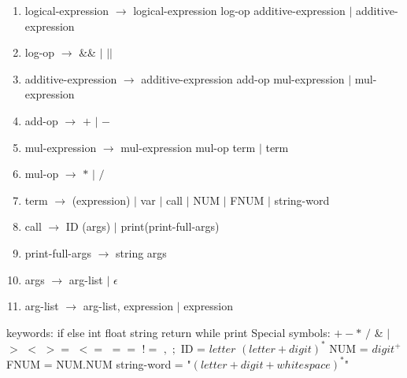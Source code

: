 \documentclass{article}
\begin{document}
\begin{enumerate}
    \item logical-expression $\rightarrow$ logical-expression log-op additive-expression $|$ additive-expression
    \item log-op $\rightarrow$ \&\& $|$ $||$
    \item additive-expression $\rightarrow$ additive-expression add-op mul-expression $|$ mul-expression
    \item add-op $\rightarrow$ $+$ $|$ $-$
    \item mul-expression $\rightarrow$ mul-expression mul-op term $|$ term
    \item mul-op $\rightarrow$ $*$ $|$ $/$
    \item term $\rightarrow$ (expression) $|$ var $|$ call $|$ NUM $|$ FNUM $|$ string-word
    \item call $\rightarrow$ ID (args) $|$ print(print-full-args)
    \item print-full-args $\rightarrow$ string args
    \item args $\rightarrow$ arg-list $|$ $\epsilon$
    \item arg-list $\rightarrow$ arg-list, expression $|$ expression
\end{enumerate}

keywords: if else int float string return while print \newline
Special symbols: $+ - *$ $/$ \& $|$ $>$ $<$ $>=$ $<=$ $==$ $!=$ $,$ $;$\newline
ID = $letter$ $(letter + digit)^*$ \newline
NUM = $digit^+$ \newline
FNUM = NUM.NUM \newline
string-word = "$(letter + digit + whitespace)^*$"
\end{document}

